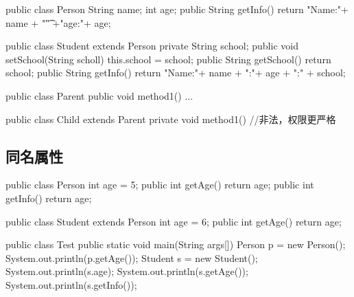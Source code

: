 \begin{javaCode}
  public class Person {
    String name;
    int age;
    public String getInfo() {
      return "Name:"+ name + "\t" +"age:"+ age;
    }
  }
\end{javaCode}


\begin{javaCode}
  public class Student extends Person {
    private String school;
    public void setSchool(String scholl) {
      this.school = school;
    }
    public String getSchool(){
      return school;
    }
    public String getInfo() {
      return "Name:"+ name + "\tAge:"+ age + "\tSchool:" + school;
    }
  }
\end{javaCode}

\begin{javaCode}
  public class Parent {
    public void method1() {...}
  }
\end{javaCode}


\begin{javaCode}
  public class Child extends Parent {
    private void method1() {} //非法，权限更严格
  }
\end{javaCode}

\subsection{同名属性}

\begin{javaCode}
  public class Person {
    int age = 5;
    public int getAge() {
      return age;
    }
    public int getInfo() {
      return age;
    }
  }
\end{javaCode}

\begin{javaCode}
  public class Student extends Person {
    int age = 6;
    public int getAge() {
      return age;
    }
  }
\end{javaCode}

\begin{javaCode}
  public class Test {
    public static void main(String args[]) {
      Person p = new Person();
      System.out.println(p.getAge());
      Student s = new Student();
      System.out.println(s.age);
      System.out.println(s.getAge());
      System.out.println(s.getInfo());
    }
  }
\end{javaCode}

